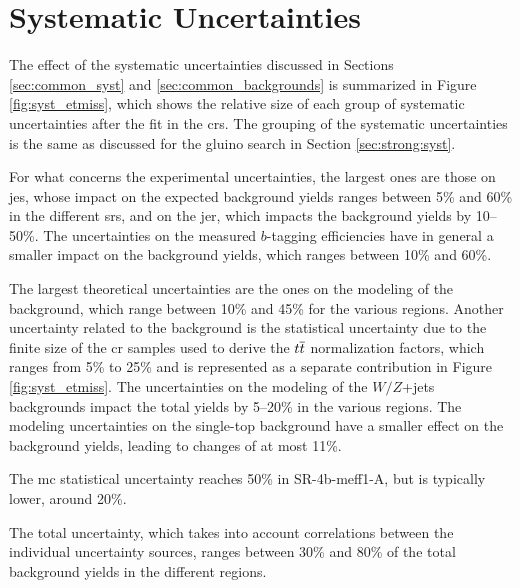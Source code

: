 \section{Systematic Uncertainties}
\label{sec:ewk:syst}

The effect of the systematic uncertainties discussed in Sections \ref{sec:common_syst} and \ref{sec:common_backgrounds} 
is summarized in Figure \ref{fig:syst_etmiss}, which shows the relative size of each group of systematic uncertainties after the fit in the 
\glspl{cr}. 
The grouping of the systematic uncertainties is the same as discussed for the gluino search in Section \ref{sec:strong:syst}. 

For what concerns the experimental uncertainties, the largest ones are those on \gls{jes}, 
whose impact on the expected background yields ranges between 5\% and 60\% in the different \glspl{sr}, 
and on the \gls{jer}, which impacts the background yields by 10--50\%. 
The uncertainties on the measured $b$-tagging efficiencies have in general a smaller impact on the background yields, 
which ranges between 10\% and 60\%. 

The largest theoretical uncertainties are the ones on the modeling of the \ttbar background, which range between 10\% and 45\% for the various regions. 
Another uncertainty related to the \ttbar background is the statistical uncertainty due to the finite size of the \gls{cr} samples used to derive  the $t\overline{t}$ normalization factors, which ranges from 5\% to 25\% and is represented as a separate contribution in Figure \ref{fig:syst_etmiss}.  
The uncertainties on the modeling of the $W/Z$+jets backgrounds  
impact the total yields by 5--20\% in the various regions. 
The modeling uncertainties on the single-top background have a smaller effect on the background yields, leading to changes of at most 11\%. 

The \gls{mc} statistical uncertainty reaches 50\% in SR-4b-meff1-A, but is typically lower, around 20\%. 
 
The total uncertainty, which takes into account correlations between the individual uncertainty sources, ranges between 30\% and 80\% 
of the total background yields in the different regions. 
 

